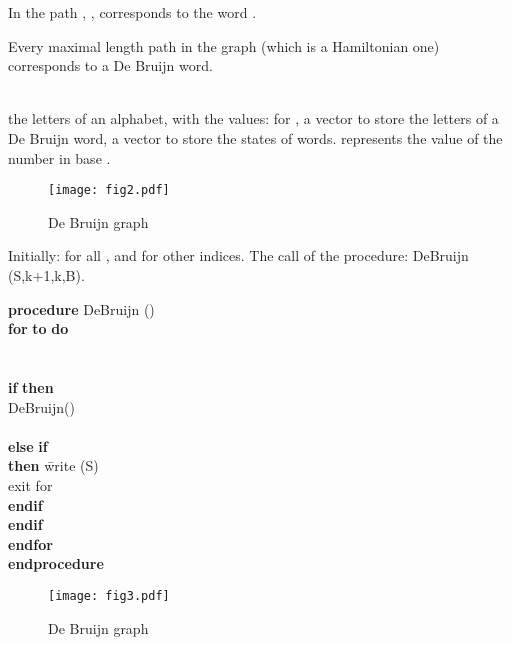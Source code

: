 \documentclass[10pt]{article}
\begin{document}
\medskip\noindent
In  the path {, , } corresponds to the 
word {.}  

\medskip\noindent
Every maximal length path in the graph  (which is a
Hamiltonian one) corresponds to a De Bruijn word.      


\bigskip\noindent{\textcolor{red}{Algorithm to generate all De Bruijn words}}
\\
 the letters of an alphabet, with the values:  for , 
 a vector to store the letters of a De Bruijn word, 
 a vector to store the states of words.   represents the value of the number  in base  . 

\begin{figure}[t]
\centering\texttt{[image: fig2.pdf]}
\label{br23}\caption{De Bruijn graph } 
\end{figure}

\medskip\noindent Initially:  for all , 
 and  for other indices. 
The call of the procedure: DeBruijn (S,k+1,k,B).

\begin{tabbing}
\textbf{{procedure}} DeBruijn ()\\
\textbf{{for}} \=  \textbf{{to}}  \textbf{{do}}\\
             \> \\
             \>  \\
             \> \textbf{{if}}  \=\textbf{{then}} \= \\
             \>                     \>              \> DeBruijn()\\
             \>                     \>              \> \\
             \>                     \>\textbf{{else}} \= \textbf{{if}}  \=         \\ 
            \> \> \> \> \textbf{{then}} \= write (S)\\
             \> \> \> \>                                           \>  exit for\\
             \>         \>            \>               \> \textbf{{endif}}  \\          
             \> \textbf{{endif}}\\
\textbf{{endfor}} \\
\textbf{{endprocedure}}            
\end{tabbing}

\begin{figure}[t]
\centering\texttt{[image: fig3.pdf]}
\label{br32}\caption{De Bruijn graph } 
\end{figure}
\end{document}
